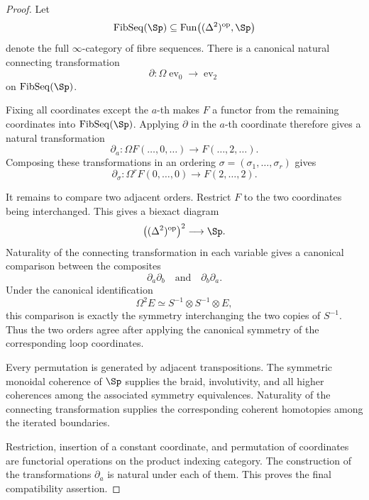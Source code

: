 \begin{proof}
Let
\[
    \operatorname{FibSeq}(\Sp)
    \subseteq
    \operatorname{Fun}
    \bigl(
      (\Delta^2)^{\mathrm{op}},
      \Sp
    \bigr)
\]
denote the full \(\infty\)-category of fibre sequences.  There is a
canonical natural connecting transformation
\[
    \partial:
    \Omega\operatorname{ev}_0
    \longrightarrow
    \operatorname{ev}_2
\]
on \(\operatorname{FibSeq}(\Sp)\).

Fixing all coordinates except the \(a\)-th makes \(F\) a functor from the
remaining coordinates into \(\operatorname{FibSeq}(\Sp)\).  Applying
\(\partial\) in the \(a\)-th coordinate therefore gives a natural
transformation
\[
    \partial_a:
    \Omega F(\ldots,0,\ldots)
    \longrightarrow
    F(\ldots,2,\ldots).
\]
Composing these transformations in an ordering
\(\sigma=(\sigma_1,\ldots,\sigma_r)\) gives
\[
    \partial_\sigma:
    \Omega^rF(0,\ldots,0)
    \longrightarrow
    F(2,\ldots,2).
\]

It remains to compare two adjacent orders.  Restrict \(F\) to the two
coordinates being interchanged.  This gives a biexact diagram
\[
    \bigl(
      (\Delta^2)^{\mathrm{op}}
    \bigr)^2
    \longrightarrow
    \Sp.
\]
Naturality of the connecting transformation in each variable gives a
canonical comparison between the composites
\[
    \partial_a\partial_b
    \quad\text{and}\quad
    \partial_b\partial_a.
\]
Under the canonical identification
\[
    \Omega^2E
    \simeq
    S^{-1}\otimes S^{-1}\otimes E,
\]
this comparison is exactly the symmetry interchanging the two copies of
\(S^{-1}\).  Thus the two orders agree after applying the canonical
symmetry of the corresponding loop coordinates.

Every permutation is generated by adjacent transpositions.  The symmetric
monoidal coherence of \(\Sp\) supplies the braid, involutivity, and all
higher coherences among the associated symmetry equivalences.  Naturality
of the connecting transformation supplies the corresponding coherent
homotopies among the iterated boundaries.

Restriction, insertion of a constant coordinate, and permutation of
coordinates are functorial operations on the product indexing category.
The construction of the transformations \(\partial_a\) is natural under
each of them.  This proves the final compatibility assertion.
\end{proof}


